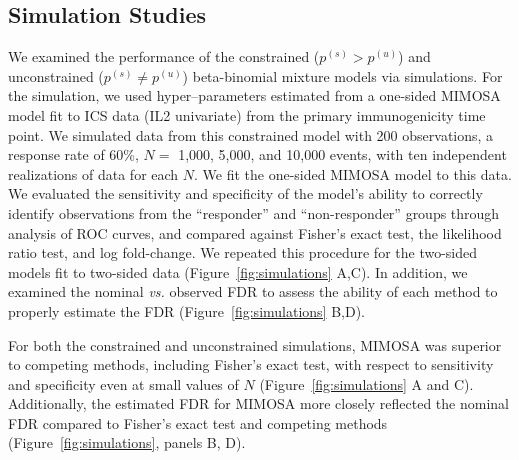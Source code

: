 \documentclass[12pt,oupdraft]{biostatistics}
\begin{document}
\subsection{Simulation Studies}

We examined the performance of the constrained ($p^{(s)}>p^{(u)}$) and unconstrained ($p^{(s)} \ne p^{(u)}$) beta-binomial mixture models via simulations. For the simulation, we used hyper--parameters estimated from a one-sided MIMOSA model fit to ICS data (IL2 univariate) from the primary immunogenicity time point. We simulated data from this constrained model with 200 observations, a response rate of 60\%, $N=$ 1,000, 5,000, and 10,000 events, with ten independent realizations of data for each $N$. We fit the one-sided MIMOSA model to this data. We evaluated the sensitivity and specificity of the model's ability to correctly identify observations from the ``responder'' and ``non-responder'' groups through analysis of ROC curves, and compared against Fisher's exact test, the likelihood ratio test, and log fold-change. We repeated this procedure for the two-sided models fit to two-sided data (Figure~\ref{fig:simulations} A,C). In addition, we examined the nominal \textit{vs.} observed FDR to assess the ability of each method to properly estimate the FDR (Figure~\ref{fig:simulations} B,D).

For both the constrained and unconstrained simulations, MIMOSA was superior to competing methods, including Fisher's exact test, with respect to sensitivity and specificity even at small values of $N$ (Figure~\ref{fig:simulations} A and C). Additionally, the estimated FDR for MIMOSA more closely reflected the nominal FDR compared to Fisher's exact test and competing methods (Figure~\ref{fig:simulations}, panels B, D).
\end{document}
